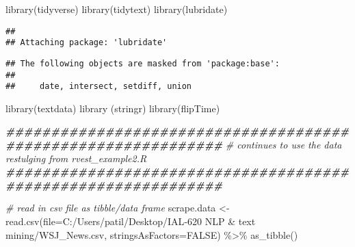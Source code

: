 \documentclass[
]{article}
\newenvironment{Shaded}{\begin{snugshade}}{\end{snugshade}}
\newcommand{\AttributeTok}[1]{\textcolor[rgb]{0.77,0.63,0.00}{#1}}
\newcommand{\CommentTok}[1]{\textcolor[rgb]{0.56,0.35,0.01}{\textit{#1}}}
\newcommand{\ConstantTok}[1]{\textcolor[rgb]{0.00,0.00,0.00}{#1}}
\newcommand{\DocumentationTok}[1]{\textcolor[rgb]{0.56,0.35,0.01}{\textbf{\textit{#1}}}}
\newcommand{\FunctionTok}[1]{\textcolor[rgb]{0.00,0.00,0.00}{#1}}
\newcommand{\NormalTok}[1]{#1}
\newcommand{\OtherTok}[1]{\textcolor[rgb]{0.56,0.35,0.01}{#1}}
\newcommand{\SpecialCharTok}[1]{\textcolor[rgb]{0.00,0.00,0.00}{#1}}
\newcommand{\StringTok}[1]{\textcolor[rgb]{0.31,0.60,0.02}{#1}}
\begin{document}
\begin{Shaded}
\begin{Highlighting}[]
\FunctionTok{library}\NormalTok{(tidyverse)}
\FunctionTok{library}\NormalTok{(tidytext)}
\FunctionTok{library}\NormalTok{(lubridate)}
\end{Highlighting}
\end{Shaded}

\begin{verbatim}
## 
## Attaching package: 'lubridate'
\end{verbatim}

\begin{verbatim}
## The following objects are masked from 'package:base':
## 
##     date, intersect, setdiff, union
\end{verbatim}

\begin{Shaded}
\begin{Highlighting}[]
\FunctionTok{library}\NormalTok{(textdata)}
\FunctionTok{library}\NormalTok{ (stringr)}
\FunctionTok{library}\NormalTok{(flipTime)}

\DocumentationTok{\#\#\#\#\#\#\#\#\#\#\#\#\#\#\#\#\#\#\#\#\#\#\#\#\#\#\#\#\#\#\#\#\#\#\#\#\#\#\#\#\#\#\#\#\#\#\#\#\#\#\#\#\#\#\#\#\#\#\#\#\#\#}
\CommentTok{\# continues to use the data restulging from rvest\_example2.R}
\DocumentationTok{\#\#\#\#\#\#\#\#\#\#\#\#\#\#\#\#\#\#\#\#\#\#\#\#\#\#\#\#\#\#\#\#\#\#\#\#\#\#\#\#\#\#\#\#\#\#\#\#\#\#\#\#\#\#\#\#\#\#\#\#\#\#}

\CommentTok{\# read in csv file as tibble/data frame}
\NormalTok{scrape.data }\OtherTok{\textless{}{-}} \FunctionTok{read.csv}\NormalTok{(}\AttributeTok{file=}\StringTok{\textquotesingle{}C:/Users/patil/Desktop/IAL{-}620 NLP \& text mining/WSJ\_News.csv\textquotesingle{}}\NormalTok{, }\AttributeTok{stringsAsFactors=}\ConstantTok{FALSE}\NormalTok{) }\SpecialCharTok{\%\textgreater{}\%}
  \FunctionTok{as\_tibble}\NormalTok{()}


\end{Highlighting}
\end{Shaded}
\end{document}
